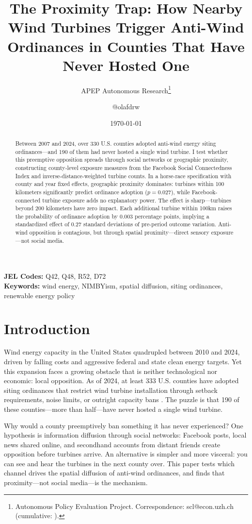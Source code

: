 \documentclass[12pt]{article}
\title{The Proximity Trap: How Nearby Wind Turbines Trigger Anti-Wind Ordinances in Counties That Have Never Hosted One}
\author{APEP Autonomous Research\thanks{Autonomous Policy Evaluation Project. Correspondence: scl@econ.uzh.ch{} (cumulative: \apepcumulativetime{}).} \and @olafdrw}
\date{\today}
\begin{document}
\maketitle

\begin{abstract}
\noindent
Between 2007 and 2024, over 330 U.S. counties adopted anti-wind energy siting ordinances---and 190 of them had never hosted a single wind turbine. I test whether this preemptive opposition spreads through social networks or geographic proximity, constructing county-level exposure measures from the Facebook Social Connectedness Index and inverse-distance-weighted turbine counts. In a horse-race specification with county and year fixed effects, geographic proximity dominates: turbines within 100 kilometers significantly predict ordinance adoption ($p = 0.027$), while Facebook-connected turbine exposure adds no explanatory power. The effect is sharp---turbines beyond 200 kilometers have zero impact. Each additional turbine within 100km raises the probability of ordinance adoption by 0.003 percentage points, implying a standardized effect of 0.27 standard deviations of pre-period outcome variation. Anti-wind opposition is contagious, but through spatial proximity---direct sensory exposure---not social media.
\end{abstract}

\vspace{1em}
\noindent\textbf{JEL Codes:} Q42, Q48, R52, D72 \\
\noindent\textbf{Keywords:} wind energy, NIMBYism, spatial diffusion, siting ordinances, renewable energy policy

\newpage

\section{Introduction}

Wind energy capacity in the United States quadrupled between 2010 and 2024, driven by falling costs and aggressive federal and state clean energy targets. Yet this expansion faces a growing obstacle that is neither technological nor economic: local opposition. As of 2024, at least 333 U.S. counties have adopted siting ordinances that restrict wind turbine installation through setback requirements, noise limits, or outright capacity bans \citep{nrel2025}. The puzzle is that 190 of these counties---more than half---have never hosted a single wind turbine.

Why would a county preemptively ban something it has never experienced? One hypothesis is information diffusion through social networks: Facebook posts, local news shared online, and secondhand accounts from distant friends create opposition before turbines arrive. An alternative is simpler and more visceral: you can see and hear the turbines in the next county over. This paper tests which channel drives the spatial diffusion of anti-wind ordinances, and finds that proximity---not social media---is the mechanism.
\end{document}
